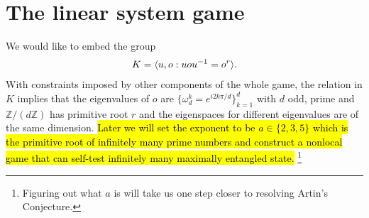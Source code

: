 \documentclass[11pt,letterpaper]{article}
\DeclarePairedDelimiter{\ip}{\langle}{\rangle}
\newcommand{\Z}{\mathbb{Z}}
\newcommand{\1}{\mathbb{1}}
\theoremstyle{definition}
\begin{document}
\section{The linear system game}
We would like to embed the group 
\begin{align}
	K = \ip{u,o: uou^{-1} = o^r}.
\end{align}
With constraints imposed by other components of the whole game, the relation in $K$ 
implies that the eigenvalues of $o$ are $\{\omega_d^k = e^{i2k\pi/d}\}_{k=1}^d$ with $d$ odd, prime and
$\Z/(d\Z)$ has primitive root $r$ and the eigenspaces for different eigenvalues are of the same dimension.
\hl{Later we will set the exponent to be $a \in \{2, 3, 5\}$ which is the primitive root of infinitely many prime numbers and
construct a nonlocal game that can self-test infinitely many maximally entangled state.}
\footnote{Figuring out what $a$ is will take us one step closer to resolving Artin's Conjecture\cite{murty1988}.}
\end{document}
